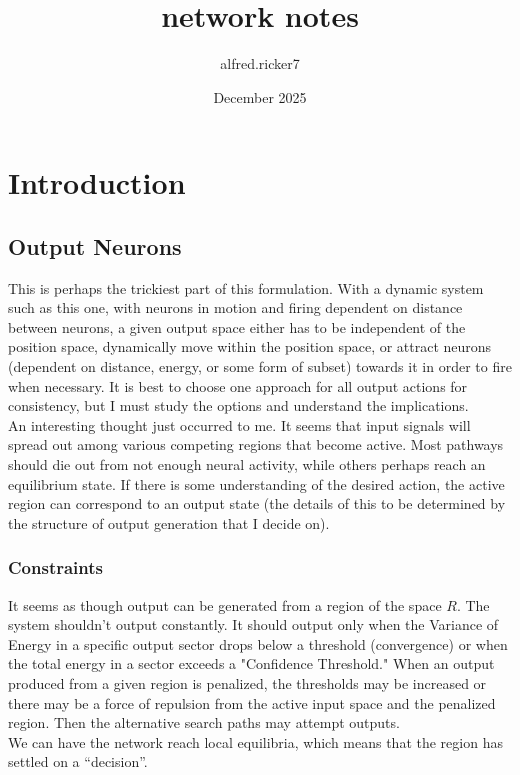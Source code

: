 \documentclass{article}
\title{network notes}
\author{alfred.ricker7 }
\date{December 2025}
\begin{document}
\maketitle

\section{Introduction}
\subsection{Output Neurons}
This is perhaps the trickiest part of this formulation. With a dynamic system such as this one, with neurons in motion and firing dependent on distance between neurons, a given output space either has to be independent of the position space, dynamically move within the position space, or attract neurons (dependent on distance, energy, or some form of subset) towards it in order to fire when necessary. It is best to choose one approach for all output actions for consistency, but I must study the options and understand the implications. \\

An interesting thought just occurred to me. It seems that input signals will spread out among various competing regions that become active. Most pathways should die out from not enough neural activity, while others perhaps reach an equilibrium state. If there is some understanding of the desired action, the active region can correspond to an output state (the details of this to be determined by the structure of output generation that I decide on).

\subsubsection{Constraints}
It seems as though output can be generated from a region of the space $R$. The system shouldn't output constantly. It should output only when the Variance of Energy in a specific output sector drops below a threshold (convergence) or when the total energy in a sector exceeds a "Confidence Threshold." When an output produced from a given region is penalized, the thresholds may be increased or there may be a force of repulsion from the active input space and the penalized region. Then the alternative search paths may attempt outputs. \\

We can have the network reach local equilibria, which means that the region has settled on a ``decision''.
\end{document}
